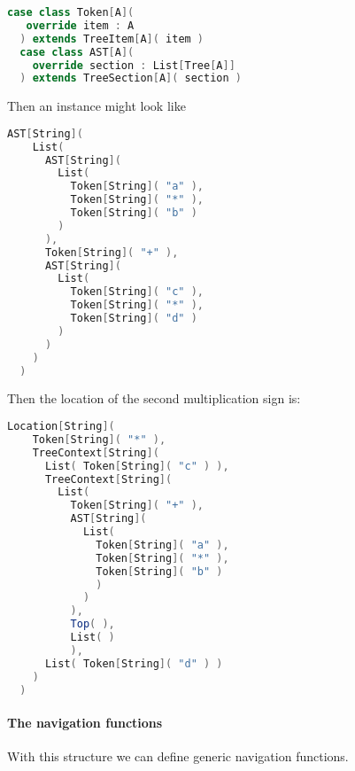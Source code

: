 \begin{lstlisting}[language=Scala,mathescape=true]
  case class Token[A](
   override item : A
  ) extends TreeItem[A]( item )
  case class AST[A](
    override section : List[Tree[A]]
  ) extends TreeSection[A]( section )
\end{lstlisting}

Then an instance might look like

\begin{lstlisting}[language=Scala,mathescape=true]
  AST[String](
    List(
      AST[String](
        List(
          Token[String]( "a" ),
          Token[String]( "*" ),
          Token[String]( "b" )
        )
      ),
      Token[String]( "+" ),
      AST[String](
        List(
          Token[String]( "c" ),
          Token[String]( "*" ),
          Token[String]( "d" )
        )
      )
    )
  )
\end{lstlisting}

Then the location of the second multiplication sign is:

\begin{lstlisting}[language=Scala,mathescape=true]
  Location[String](
    Token[String]( "*" ),
    TreeContext[String](
      List( Token[String]( "c" ) ),
      TreeContext[String](
        List(
          Token[String]( "+" ),
          AST[String](
            List(
              Token[String]( "a" ),
              Token[String]( "*" ),
              Token[String]( "b" )
              )
            )
          ),
          Top( ),
          List( )
          ),
      List( Token[String]( "d" ) )
    )
  )
\end{lstlisting}

\paragraph{The navigation functions} With this structure we can define
generic navigation functions.

